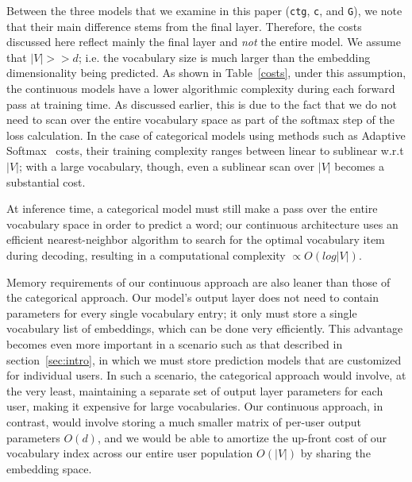 \documentclass[11pt,a4paper]{article}
\begin{document}

Between the three models that we examine in this paper ({\tt ctg}, \texttt{c}, and \texttt{G}), we note that their main difference stems from the final layer. Therefore, the costs discussed here reflect mainly the final layer and \textit{not} the entire model.
We assume that $|V|>>d$; i.e. the vocabulary size is much larger than the embedding dimensionality being predicted. 
As shown in Table~\ref{costs}, under this assumption, the continuous models have a lower algorithmic complexity during each forward pass at training time. 
As discussed earlier, this is due to the fact that we do not need to scan over the entire vocabulary space as part of the softmax step of the loss calculation.
In the case of categorical models using methods such as Adaptive Softmax~\citep{grave2017efficient} costs, their training complexity ranges between linear to sublinear w.r.t $|V|$; with a large vocabulary, though, even a sublinear scan over $|V|$ becomes a substantial cost.

At inference time, a categorical model must still make a pass over the entire vocabulary space in order to predict a word; our continuous architecture uses an efficient nearest-neighbor algorithm to search for the optimal vocabulary item during decoding, resulting in a
computational complexity $\propto O(log|V|)$. 

Memory requirements of our continuous approach are also leaner than those of the categorical approach. 
Our model's output layer does not need to contain parameters for every single vocabulary entry; it only must store a single vocabulary list of embeddings, which can be done very efficiently. 
This advantage becomes even more important in a scenario such as that described in section~\ref{sec:intro}, in which we must store prediction models that are customized for individual users.
In such a scenario, the categorical approach would involve, at the very least, maintaining a separate set of output layer parameters for each user, making it expensive for large vocabularies.
Our continuous approach, in contrast, would involve storing a much smaller matrix of per-user output parameters $O(d)$, and
we would be able to amortize the up-front cost of our vocabulary index across our entire user population $O(|V|)$ by sharing the embedding space.
\end{document}
